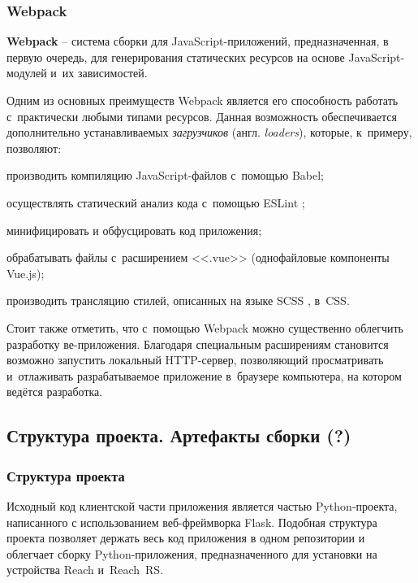 \subsubsection{Webpack}

\textbf{Webpack} -- система сборки для JavaScript-приложений, предназначенная, в первую очередь, для генерирования статических ресурсов на основе JavaScript-модулей и~их зависимостей.

Одним из основных преимуществ Webpack является его способность работать с~практически любыми типами ресурсов. Данная возможность обеспечивается дополнительно устанавливаемых \emph{загрузчиков} (англ. \emph{loaders}), которые, к~примеру, позволяют:
\begin{dashitemize}
  \item производить компиляцию JavaScript-файлов с~помощью Babel;
  \item осуществлять статический анализ кода с~помощью ESLint \cite{ESLint};
  \item минифицировать и обфусцировать код приложения;
  \item обрабатывать файлы с~расширением <<.vue>> (однофайловые компоненты Vue.js);
  \item производить трансляцию стилей, описанных на языке SCSS \cite{Sass}, в~CSS.
\end{dashitemize}

Стоит также отметить, что с~помощью Webpack можно существенно облегчить разработку ве-приложения. Благодаря специальным расширениям становится возможно запустить локальный HTTP-сервер, позволяющий просматривать и~отлаживать разрабатываемое приложение в~браузере компьютера, на котором ведётся разработка.



\subsection{Структура проекта. Артефакты сборки (?)}


\subsubsection{Структура проекта}

Исходный код клиентской части приложения является частью Python-проекта, написанного с использованием веб-фреймворка Flask. Подобная структура проекта позволяет держать весь код приложения в одном репозитории и облегчает сборку Python-приложения, предназначенного для установки на устройства Reach и~Reach~RS.

